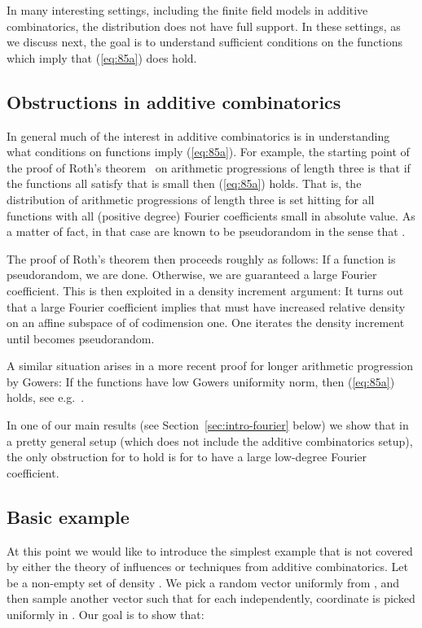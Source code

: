 \documentclass{daj}
\newcommand{\1}{\mathbbm{1}}
\theoremstyle{plain}
\theoremstyle{definition}
\begin{document}
In many interesting settings, including the finite field models in
additive combinatorics, the distribution  does not have full
support. In these settings, as we discuss next,
the goal is to understand sufficient conditions
on the functions which imply that (\ref{eq:85a}) does hold. 

\subsection{Obstructions in additive combinatorics} 
In general much of the interest in additive combinatorics is in understanding
what conditions on functions  imply (\ref{eq:85a}).
For example, the starting point of the proof of Roth's theorem~\cite{Rot53}
on arithmetic progressions of length three is that
if the functions  all satisfy that 
 is small
then (\ref{eq:85a}) holds. That is, the distribution of arithmetic progressions
of length three is set hitting for all functions  with
all (positive degree) Fourier coefficients small in absolute value.
As a matter of fact,
in that case  are known to be pseudorandom in the sense
that .

The proof of Roth's theorem then proceeds roughly as follows: If a function 
is pseudorandom, we are done. Otherwise, we are guaranteed a large Fourier
coefficient. This is then exploited in a density increment argument:
It turns out that a large Fourier coefficient implies that  must
have increased relative density on an affine subspace of 
of codimension one.
One iterates the density increment until  becomes pseudorandom.

A similar situation arises in a more recent proof
for longer arithmetic progression by Gowers:
If the functions  have low Gowers uniformity norm, then 
 (\ref{eq:85a}) holds, see e.g.~\cite{Green05}. 
 
 In one of our main results (see Section~\ref{sec:intro-fourier} below)
 we show that in a pretty general setup (which does not include the additive
 combinatorics setup), the only obstruction for  to hold is for
  to have a large low-degree Fourier coefficient. 

\subsection{Basic example}
\label{sec:basic}

At this point we would like to introduce the simplest example that is not covered by either the theory of influences or techniques from additive combinatorics. 
Let  be a non-empty set of density
.  We pick a random vector
 uniformly from , and then
sample another vector  such that for each
 independently, coordinate  is picked uniformly in
.  Our goal is to show that:
\end{document}
